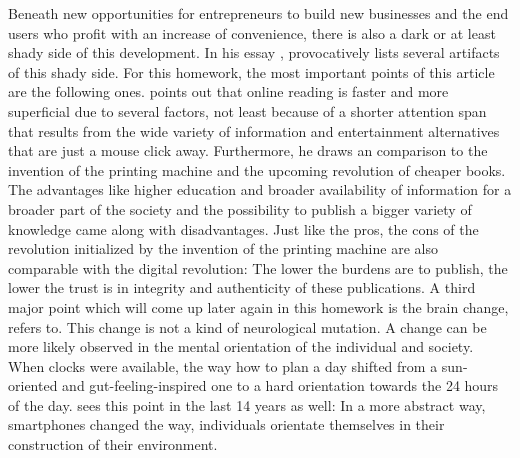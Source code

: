 \documentclass[11pt,a4paper]{article}
\begin{document}
Beneath new opportunities for entrepreneurs to build new businesses and the end users who profit with an increase of convenience, there is also a dark or at least shady side of this development. In his essay , \cite[][]{Carr.2008} provocatively lists several artifacts of this shady side. For this homework, the most important points of this article are the following ones. \cite[][]{Carr.2008} points out that online reading is faster and more superficial due to several factors, not least because of a shorter attention span that results from the wide variety of information and entertainment alternatives that are just a mouse click away. Furthermore, he draws an comparison to the invention of the printing machine and the upcoming revolution of cheaper books. The advantages like higher education and broader availability of information for a broader part of the society and the possibility to publish a bigger variety of knowledge came along with disadvantages. Just like the pros, the cons of the revolution initialized by the invention of the printing machine are also comparable with the digital revolution: The lower the burdens are to publish, the lower the trust is in integrity and authenticity of these publications. A third major point which will come up later again in this homework is the brain change, \cite[][]{Carr.2008} refers to. This change is not a kind of neurological mutation. A change can be more likely observed in the mental orientation of the individual and society. When clocks were available, the way how to plan a day shifted from a sun-oriented and gut-feeling-inspired one to a hard orientation towards the 24 hours of the day. \cite[][]{Carr.2008} sees this point in the last 14 years as well: In a more abstract way, smartphones changed the way, individuals orientate themselves in their construction of their environment.
\end{document}
